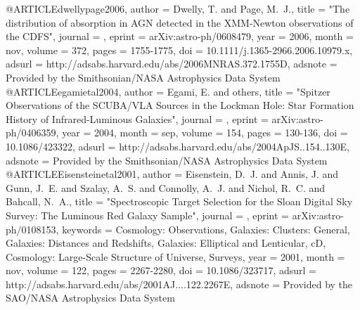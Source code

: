 {{{{{{{{{{{{{{{@ARTICLE{dwellypage2006,
   author = {{Dwelly}, T. and {Page}, M.~J.},
    title = "{The distribution of absorption in AGN detected in the XMM-Newton observations of the CDFS}",
  journal = {\mnras},
   eprint = {arXiv:astro-ph/0608479},
     year = 2006,
    month = nov,
   volume = 372,
    pages = {1755-1775},
      doi = {10.1111/j.1365-2966.2006.10979.x},
   adsurl = {http://adsabs.harvard.edu/abs/2006MNRAS.372.1755D},
  adsnote = {Provided by the Smithsonian/NASA Astrophysics Data System}
}
@ARTICLE{egamietal2004,
   author = {{Egami}, E. and others},
    title = "{Spitzer Observations of the SCUBA/VLA Sources in the Lockman Hole: Star Formation History of Infrared-Luminous Galaxies}",
  journal = {\apjs},
   eprint = {arXiv:astro-ph/0406359},
     year = 2004,
    month = sep,
   volume = 154,
    pages = {130-136},
      doi = {10.1086/423322},
   adsurl = {http://adsabs.harvard.edu/abs/2004ApJS..154..130E},
  adsnote = {Provided by the Smithsonian/NASA Astrophysics Data System}
}
@ARTICLE{Eisensteinetal2001,
   author = {{Eisenstein}, D.~J. and {Annis}, J. and {Gunn}, J.~E. and {Szalay}, A.~S. and 
	{Connolly}, A.~J. and {Nichol}, R.~C. and {Bahcall}, N.~A.},
    title = "{Spectroscopic Target Selection for the Sloan Digital Sky Survey: The Luminous Red Galaxy Sample}",
  journal = {\aj},
   eprint = {arXiv:astro-ph/0108153},
 keywords = {Cosmology: Observations, Galaxies: Clusters: General, Galaxies: Distances and Redshifts, Galaxies: Elliptical and Lenticular, cD, Cosmology: Large-Scale Structure of Universe, Surveys},
     year = 2001,
    month = nov,
   volume = 122,
    pages = {2267-2280},
      doi = {10.1086/323717},
   adsurl = {http://adsabs.harvard.edu/abs/2001AJ....122.2267E},
  adsnote = {Provided by the SAO/NASA Astrophysics Data System}
}


}}}}}}}}}}}}}}}
